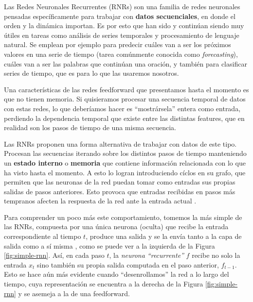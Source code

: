 \documentclass[../../main.tex]{subfiles}
\begin{document}
Las Redes Neuronales Recurrentes (RNRs) son una familia de redes neuronales pensadas
específicamente para trabajar con \textbf{datos secuenciales}, en donde el orden y la
dinámica importan. Es por esto que han sido y continúan siendo muy útiles en tareas como
análisis de series temporales y procesamiento de lenguaje natural. Se emplean por ejemplo
para predecir cuáles van a ser los próximos valores en una serie de tiempo (tarea
comúnmente conocida como \textit{forecasting}), cuáles van a ser las palabras que
continúan una oración, y también para clasificar series de tiempo, que es para lo que las
usaremos nosotros.

Una características de las redes feedforward que presentamos hasta el momento es que no
tienen memoria. Si quisieramos procesar una secuencia temporal de datos con estas redes,
lo que deberíamos hacer es ``mostrársela'' entera como entrada, perdiendo la dependencia
temporal que existe entre las distintas features, que en realidad son los pasos de tiempo
de una misma secuencia.

Las RNRs proponen una forma alternativa de trabajar con datos de este tipo. Procesan las
secuencias iterando sobre los distintos pasos de tiempo manteniendo un \textbf{estado
interno} o \textbf{memoria} que contiene información relacionada con lo que ha visto hasta
el momento\footnotemark. A esto lo logran introduciendo cíclos en su grafo, que permiten
que las neuronas de la red puedan tomar como entradas sus propias salidas de pasos
anteriores. Esto provoca que entradas recibidas en pasos más tempranos afecten la
respuesta de la red ante la entrada actual \cite{ai-a-modern-approach} .

Para comprender un poco más este comportamiento, tomemos la más simple de las RNRs,
compuesta por una única neurona (oculta) que recibe la entrada correspondiente al tiempo
\(t\), produce una salida y se la envía tanto a la capa de salida como a sí misma
\cite{hands-on-ML-sklearn-tf}, como se puede ver a la izquierda de la Figura
\ref{fig:simple-rnn}. Así, en cada paso \(t\), la \textit{neurona ``recurrente''} \(f\)
recibe no solo la entrada \(x_t\) sino también su propia salida computada en el paso
anterior, \(f_{t-1}\). Esto se hace aún más evidente cuando ``desenrollamos'' la red a lo
largo del tiempo, cuya representación se encuentra a la derecha de la Figura
\ref{fig:simple-rnn} y se asemeja a la de una feedforward.
\end{document}
